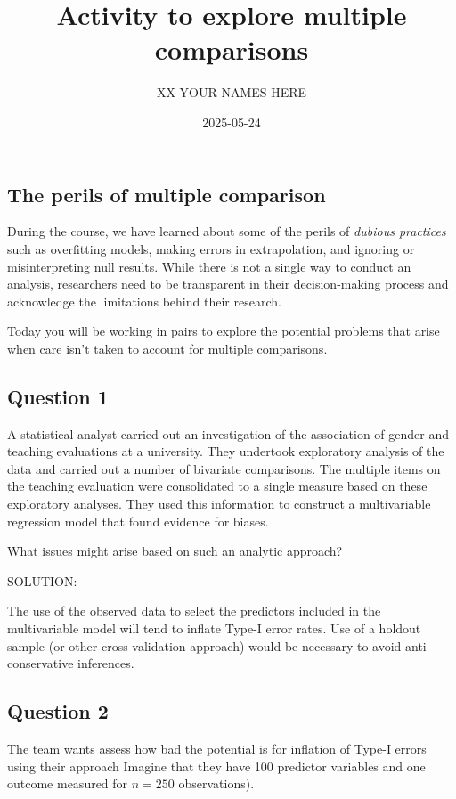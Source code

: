 \documentclass[
  letterpaper,
  DIV=11,
  numbers=noendperiod]{scrartcl}
\title{Activity to explore multiple comparisons}
\author{XX YOUR NAMES HERE}
\date{2025-05-24}
\begin{document}
\maketitle


\subsection{The perils of multiple
comparison}\label{the-perils-of-multiple-comparison}

During the course, we have learned about some of the perils of
\emph{dubious practices} such as overfitting models, making errors in
extrapolation, and ignoring or misinterpreting null results. While there
is not a single way to conduct an analysis, researchers need to be
transparent in their decision-making process and acknowledge the
limitations behind their research.

Today you will be working in pairs to explore the potential problems
that arise when care isn't taken to account for multiple comparisons.

\subsection{Question 1}\label{question-1}

A statistical analyst carried out an investigation of the association of
gender and teaching evaluations at a university. They undertook
exploratory analysis of the data and carried out a number of bivariate
comparisons. The multiple items on the teaching evaluation were
consolidated to a single measure based on these exploratory analyses.
They used this information to construct a multivariable regression model
that found evidence for biases.

What issues might arise based on such an analytic approach?

SOLUTION:

The use of the observed data to select the predictors included in the
multivariable model will tend to inflate Type-I error rates. Use of a
holdout sample (or other cross-validation approach) would be necessary
to avoid anti-conservative inferences.

\subsection{Question 2}\label{question-2}

The team wants assess how bad the potential is for inflation of Type-I
errors using their approach Imagine that they have 100 predictor
variables and one outcome measured for \(n=250\) observations).
\end{document}

